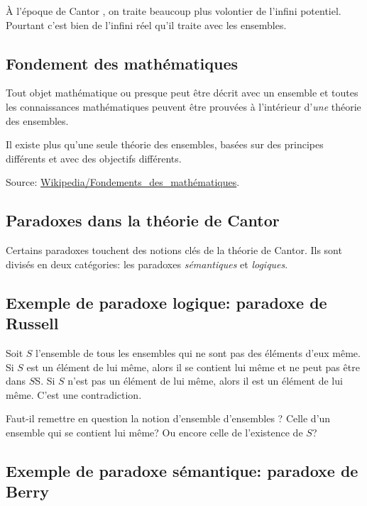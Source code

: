 \documentclass[fleqn,a4paper,nobib]{tufte-handout}
\begin{document}
À l'époque de Cantor
,
on traite beaucoup plus volontier de l'infini potentiel.
Pourtant c'est bien de l'infini réel qu'il traite avec
les ensembles.

\subsection{Fondement des mathématiques}


Tout objet mathématique ou presque peut être décrit avec un ensemble et
toutes les connaissances mathématiques peuvent être prouvées à l'intérieur
d'\textit{une} théorie des ensembles.

Il existe plus qu'une seule théorie des ensembles, basées sur
des principes différents et avec des objectifs différents.

Source: \href{https://fr.wikipedia.org/wiki/Fondements_des_math%C3%A9matiques}{Wikipedia/Fondements\_des\_mathématiques}.

\subsection{Paradoxes dans la théorie de Cantor}

Certains paradoxes touchent des notions clés de la théorie de Cantor.
Ils sont divisés en deux catégories: les paradoxes \textit{sémantiques}
et \textit{logiques}.

\subsection*{Exemple de paradoxe logique: paradoxe de Russell}

Soit $S$ l'ensemble de tous les ensembles qui ne sont pas des éléments
d'eux même. Si $S$ est un élément de lui même, alors il se contient lui
même et ne peut pas être dans \(S\)S. Si $S$ n'est pas un élément de lui même,
alors il est un élément de lui même. C'est une contradiction.

Faut-il remettre en question la notion d'ensemble d'ensembles ?
Celle d'un ensemble qui se contient lui même? Ou encore celle
de l'existence de $S$?

\subsection*{Exemple de paradoxe sémantique: paradoxe de Berry}
\end{document}
